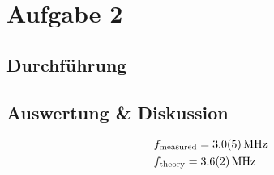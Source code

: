 \section{Aufgabe 2}

\subsection{Durchführung}



\subsection{Auswertung \& Diskussion}

    \begin{align}
        & f\sub{measured} = \SI{3.0 \pm 0.5}{\mega\hertz} \\
        & f\sub{theory} = \SI{3.6(2)}{\mega\hertz} 
    \end{align}
